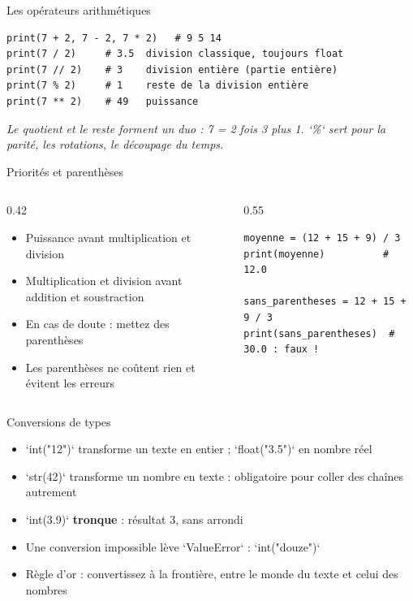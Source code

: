 \documentclass[aspectratio=169,11pt]{beamer}
\begin{document}
\begin{frame}[fragile]{Les opérateurs arithmétiques}

\begin{lstlisting}[style=py]
print(7 + 2, 7 - 2, 7 * 2)   # 9 5 14
print(7 / 2)     # 3.5  division classique, toujours float
print(7 // 2)    # 3    division entière (partie entière)
print(7 % 2)     # 1    reste de la division entière
print(7 ** 2)    # 49   puissance
\end{lstlisting}
\vspace{0.5pt}

{\small\color{PyGris}\itshape Le quotient et le reste forment un duo : 7 = 2 fois 3 plus 1. `\%` sert pour la parité, les rotations, le découpage du temps.}

\end{frame}

\begin{frame}[fragile]{Priorités et parenthèses}
\begin{columns}[t]
\begin{column}{0.42\textwidth}
\begin{itemize}
  \setlength{\itemsep}{1.5pt}\setlength{\parskip}{0pt}
  \item Puissance avant multiplication et division
  \item Multiplication et division avant addition et soustraction
  \item En cas de doute : mettez des parenthèses
  \item Les parenthèses ne coûtent rien et évitent les erreurs
\end{itemize}
\end{column}
\hspace{0.02\textwidth}
\begin{column}{0.55\textwidth}
\begin{lstlisting}[style=pysmall]
moyenne = (12 + 15 + 9) / 3
print(moyenne)          # 12.0

sans_parentheses = 12 + 15 + 9 / 3
print(sans_parentheses)  # 30.0 : faux !
\end{lstlisting}
\end{column}
\end{columns}
\end{frame}

\begin{frame}{Conversions de types}
\begin{itemize}
  \item `int("12")` transforme un texte en entier ; `float("3.5")` en nombre réel
  \item `str(42)` transforme un nombre en texte : obligatoire pour coller des chaînes autrement
  \item `int(3.9)` \textbf{tronque} : résultat 3, sans arrondi
  \item Une conversion impossible lève `ValueError` : `int("douze")`
  \item Règle d'or : convertissez à la frontière, entre le monde du texte et celui des nombres
\end{itemize}
\end{frame}
\end{document}
